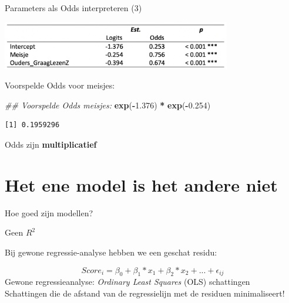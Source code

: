 \documentclass[
  10pt,
  ignorenonframetext,
]{beamer}
\newenvironment{Shaded}{\begin{snugshade}}{\end{snugshade}}
\newcommand{\CommentTok}[1]{\textcolor[rgb]{0.56,0.35,0.01}{\textit{#1}}}
\newcommand{\FloatTok}[1]{\textcolor[rgb]{0.00,0.00,0.81}{#1}}
\newcommand{\KeywordTok}[1]{\textcolor[rgb]{0.13,0.29,0.53}{\textbf{#1}}}
\newcommand{\NormalTok}[1]{#1}
\newcommand{\OperatorTok}[1]{\textcolor[rgb]{0.81,0.36,0.00}{\textbf{#1}}}
\newcommand{\StringTok}[1]{\textcolor[rgb]{0.31,0.60,0.02}{#1}}
\begin{document}
\begin{frame}[fragile]{Parameters als Odds interpreteren (3)}
\protect\hypertarget{parameters-als-odds-interpreteren-3}{}

\begin{center}
\includegraphics[width=0.75\textwidth]{LogOdds.png}
\end{center}

\bigskip

Voorspelde Odds voor meisjes:

\tiny

\begin{Shaded}
\begin{Highlighting}[]
\CommentTok{## Voorspelde Odds meisjes:}
\KeywordTok{exp}\NormalTok{(}\OperatorTok{-}\FloatTok{1.376}\NormalTok{) }\OperatorTok{*}\StringTok{ }\KeywordTok{exp}\NormalTok{(}\OperatorTok{-}\FloatTok{0.254}\NormalTok{)}
\end{Highlighting}
\end{Shaded}

\begin{verbatim}
[1] 0.1959296
\end{verbatim}

\normalsize \bigskip     Odds zijn \textbf{multiplicatief}

\end{frame}

\hypertarget{het-ene-model-is-het-andere-niet}{%
\section{Het ene model is het andere
niet}\label{het-ene-model-is-het-andere-niet}}

\begin{frame}{}
\protect\hypertarget{section-2}{}

\textcolor{uarood}{Hoe goed zijn modellen?}

\end{frame}

\begin{frame}{Geen \(R^2\)}
\protect\hypertarget{geen-r2}{}

Bij gewone regressie-analyse hebben we een geschat residu:

\[ Score_{i}= \beta_0 + \beta_1 * x_1 + \beta_2 * x_2 + ... + \epsilon_{ij}\]
\bigskip     Gewone regressieanalyse: \emph{Ordinary Least Squares}
(OLS) schattingen\\
Schattingen die de afstand van de regressielijn met de residuen
minimaliseert!

\end{frame}
\end{document}
